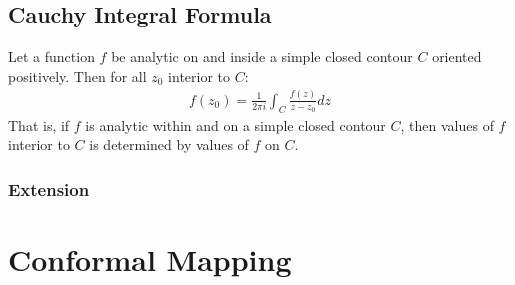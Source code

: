 \documentclass[12pt, english]{book}
\begin{document}
	\section{Cauchy Integral Formula} \label{Cauchy Integral Formula Section - Complex}
	
	\begin{theorem}
		\label{Cauchy Integral Formula}
		Let a function \(f\) be analytic on and inside a simple closed contour \(C\) oriented positively. Then for all \(z_0\) interior to \(C\):
		\begin{align*}
			f(z_0) = \frac{1}{2\pi i} \int_{C} \frac{f(z)}{z - z_0} dz
		\end{align*}
		That is, if \(f\) is analytic within and on a simple closed contour \(C\), then values of \(f\) interior to \(C\) is determined by values of \(f\) on \(C\).
	\end{theorem}
	
	
	\subsection{Extension} \label{Cauchy Integral Formula (Extension) Subsection - Complex}
	

	
	
	
	
	
	
	
	
	
	
	
	
	
	
	
	
	
	
	
	
	
	
	
	
	
	
	
	
	
	
	
	
	
	
	
	
	
	
	
	
	
	
	
	
	
	
	
	
	
	
	
	
	
	
	
	\chapter{Conformal Mapping} \label{Conformal Mapping Chapter - Complex}
	
\end{document}
